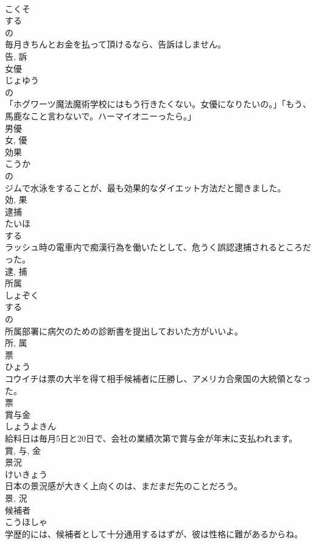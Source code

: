 \documentclass[8pt]{extreport}
\begin{document}
\begin{CJK}{UTF8}{min}
\\	こくそ	
\\	する 
\\	の 
\\	毎月きちんとお金を払って頂けるなら、告訴はしません。	
\\	告, 訴	
\\	女優	
\\	じょゆう	
\\	の 
\\	「ホグワーツ魔法魔術学校にはもう行きたくない。女優になりたいの。」「もう、馬鹿なこと言わないで。ハーマイオニーったら。」	
\\	男優 
\\	女, 優	
\\	効果	
\\	こうか	
\\	の 
\\	ジムで水泳をすることが、最も効果的なダイエット方法だと聞きました。	
\\	効, 果	
\\	逮捕	
\\	たいほ	
\\	する 
\\	ラッシュ時の電車内で痴漢行為を働いたとして、危うく誤認逮捕されるところだった。	
\\	逮, 捕	
\\	所属	
\\	しょぞく	
\\	する 
\\	の 
\\	所属部署に病欠のための診断書を提出しておいた方がいいよ。	
\\	所, 属	
\\	票	
\\	ひょう	
\\	コウイチは票の大半を得て相手候補者に圧勝し、アメリカ合衆国の大統領となった。	
\\	票	
\\	賞与金	
\\	しょうよきん	
\\	給料日は毎月5日と20日で、会社の業績次第で賞与金が年末に支払われます。	
\\	賞, 与, 金	
\\	景況	
\\	けいきょう	
\\	日本の景況感が大きく上向くのは、まだまだ先のことだろう。	
\\	景, 況	
\\	候補者	
\\	こうほしゃ	
\\	学歴的には、候補者として十分通用するはずが、彼は性格に難があるからね。	

\end{CJK}
\end{document}
